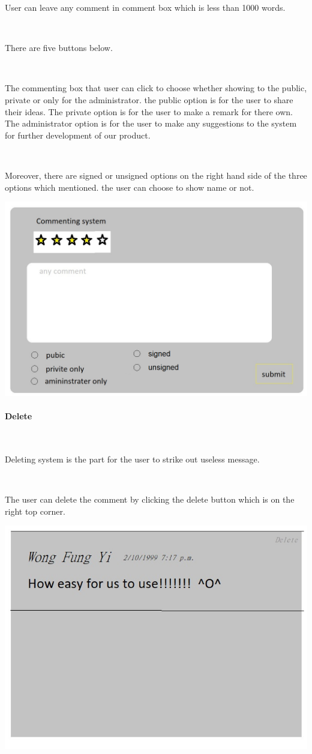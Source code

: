 User can leave any comment in comment box which is less than 1000 words.\par~

There are five buttons below.\par~

The commenting box that user can click to choose whether showing to the public, private or only for the administrator. the public option is for the user to share their ideas. The private option is for the user to make a remark for there own. The administrator option is for the user to make any suggestions to the system for further development of our product.\par~

Moreover, there are signed or unsigned options on the right hand side of the three options which mentioned. the user can choose to show name or not.

\includegraphics[scale=0.5]{Doc/Graphics/sdfg}

\paragraph{Delete}~

Deleting system is the part for the user to strike out useless message.\par~

The user can delete the comment by clicking the delete button which is on the right top corner.

\includegraphics[scale=0.5]{Doc/Graphics/asdf}
